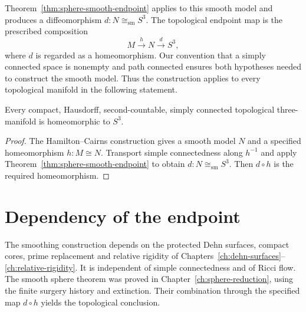 Theorem~\ref{thm:sphere-smooth-endpoint} applies to this smooth model
and produces a diffeomorphism $d:N\cong_{\mathrm{sm}}S^3$.
The topological endpoint map is the prescribed composition
\[
       M\xrightarrow{h}N\xrightarrow{d}S^3,
\]
where $d$ is regarded as a homeomorphism. Our convention that a simply
connected space is nonempty and path connected ensures both hypotheses
needed to construct the smooth model. Thus the construction applies to
every topological manifold in the following statement.

\begin{theorem}
\label{thm:topological-endpoint}
Every compact, Hausdorff, second-countable, simply connected topological
three-manifold is homeomorphic to $S^3$.
\end{theorem}

\begin{proof}
The Hamilton--Cairns construction gives a smooth model $N$ and a specified
homeomorphism $h:M\cong N$. Transport simple connectedness along
$h^{-1}$ and apply Theorem~\ref{thm:sphere-smooth-endpoint} to obtain
$d:N\cong_{\mathrm{sm}}S^3$. Then $d\circ h$ is the required
homeomorphism.
\end{proof}

\section{Dependency of the endpoint}
\label{sec:smoothing-contracts}

The smoothing construction depends on the protected Dehn surfaces,
compact cores, prime replacement and relative rigidity of
Chapters~\ref{ch:dehn-surfaces}--\ref{ch:relative-rigidity}. It is
independent of simple connectedness and of Ricci flow. The smooth sphere
theorem was proved in Chapter~\ref{ch:sphere-reduction}, using the finite
surgery history and extinction. Their combination through the specified
map $d\circ h$ yields the topological conclusion.
